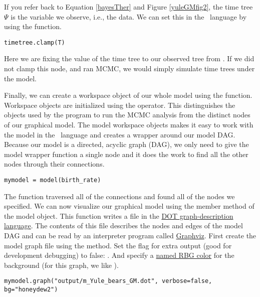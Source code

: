 If you refer back to Equation \ref{bayesTher} and Figure \ref{yuleGMfig2}, the time tree $\Psi$ is the variable we observe, i.e., the data. 
We can set this in the \Rev~language by using the  function.
{\tt \begin{snugshade*}
\begin{lstlisting}
timetree.clamp(T)
\end{lstlisting}
\end{snugshade*}}
Here we are fixing the value of the time tree to our observed tree from \citet{dosReis2012}.
If we did not clamp this node, and ran MCMC, we would simply simulate time trees under the model.

Finally, we can create a workspace object of our whole model using the  function. 
Workspace objects are initialized using the \cl{=} operator. This distinguishes the objects used by the program
to run the MCMC analysis from the distinct nodes of our graphical model.
The model workspace objects makes it easy to work with the model in the \Rev~language and creates a wrapper around our model DAG. 
Because our model is a directed, acyclic graph (DAG), we only need to give the model wrapper function a single node and it does the work to find all the other nodes through their connections.
{\tt \begin{snugshade*}
\begin{lstlisting}
mymodel = model(birth_rate)
\end{lstlisting}
\end{snugshade*}}

The  function traversed all of the connections and found all of the nodes we specified. 
We can now visualize our graphical model using the  member method of the model object. 
This function writes a file in the \href{http://en.wikipedia.org/wiki/DOT_(graph_description_language)}{DOT graph-description language}.
The contents of this file describes the nodes and edges of the model DAG and can be read by an interpreter program called \href{http://www.graphviz.org/}{Graphviz}.
First create the model graph file using the  method. Set the flag for extra output (good for development debugging) to false: .
And specify a \href{http://web.njit.edu/~kevin/rgb.txt.html}{named RBG color} for the background (for this graph, we like ). 
{\tt \begin{snugshade*}
\begin{lstlisting}
mymodel.graph("output/m_Yule_bears_GM.dot", verbose=false, bg="honeydew2")
\end{lstlisting}
\end{snugshade*}}

